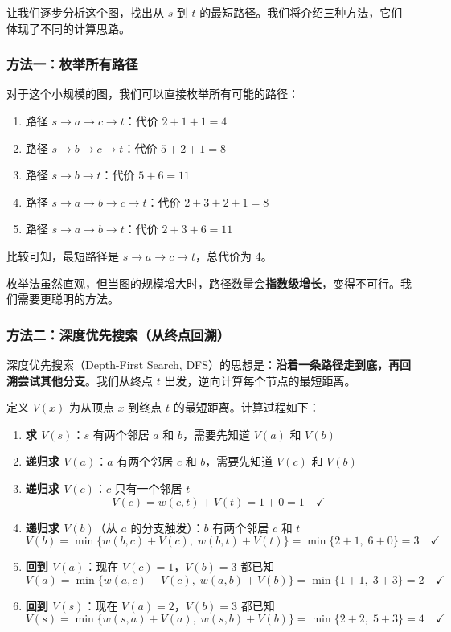 让我们逐步分析这个图，找出从 $s$ 到 $t$ 的最短路径。我们将介绍三种方法，它们体现了不同的计算思路。

\subsubsection{方法一：枚举所有路径}

对于这个小规模的图，我们可以直接枚举所有可能的路径：

\begin{enumerate}
    \item 路径 $s \to a \to c \to t$：代价 $2 + 1 + 1 = 4$
    \item 路径 $s \to b \to c \to t$：代价 $5 + 2 + 1 = 8$
    \item 路径 $s \to b \to t$：代价 $5 + 6 = 11$
    \item 路径 $s \to a \to b \to c \to t$：代价 $2 + 3 + 2 + 1 = 8$
    \item 路径 $s \to a \to b \to t$：代价 $2 + 3 + 6 = 11$
\end{enumerate}

比较可知，最短路径是 $s \to a \to c \to t$，总代价为 $4$。

枚举法虽然直观，但当图的规模增大时，路径数量会\textbf{指数级增长}，变得不可行。我们需要更聪明的方法。

\subsubsection{方法二：深度优先搜索（从终点回溯）}

深度优先搜索（Depth-First Search, DFS）的思想是：\textbf{沿着一条路径走到底，再回溯尝试其他分支}。我们从终点 $t$ 出发，逆向计算每个节点的最短距离。

定义 $V(x)$ 为从顶点 $x$ 到终点 $t$ 的最短距离。计算过程如下：

\begin{enumerate}
    \item \textbf{求 $V(s)$}：$s$ 有两个邻居 $a$ 和 $b$，需要先知道 $V(a)$ 和 $V(b)$
    
    \item \textbf{递归求 $V(a)$}：$a$ 有两个邻居 $c$ 和 $b$，需要先知道 $V(c)$ 和 $V(b)$
    
    \item \textbf{递归求 $V(c)$}：$c$ 只有一个邻居 $t$
    \[
        V(c) = w(c,t) + V(t) = 1 + 0 = 1 \quad \checkmark
    \]
    
    \item \textbf{递归求 $V(b)$}（从 $a$ 的分支触发）：$b$ 有两个邻居 $c$ 和 $t$
    \[
        V(b) = \min\{w(b,c) + V(c), \; w(b,t) + V(t)\} = \min\{2+1, \; 6+0\} = 3 \quad \checkmark
    \]
    
    \item \textbf{回到 $V(a)$}：现在 $V(c)=1$，$V(b)=3$ 都已知
    \[
        V(a) = \min\{w(a,c) + V(c), \; w(a,b) + V(b)\} = \min\{1+1, \; 3+3\} = 2 \quad \checkmark
    \]
    
    \item \textbf{回到 $V(s)$}：现在 $V(a)=2$，$V(b)=3$ 都已知
    \[
        V(s) = \min\{w(s,a) + V(a), \; w(s,b) + V(b)\} = \min\{2+2, \; 5+3\} = 4 \quad \checkmark
    \]
\end{enumerate}

